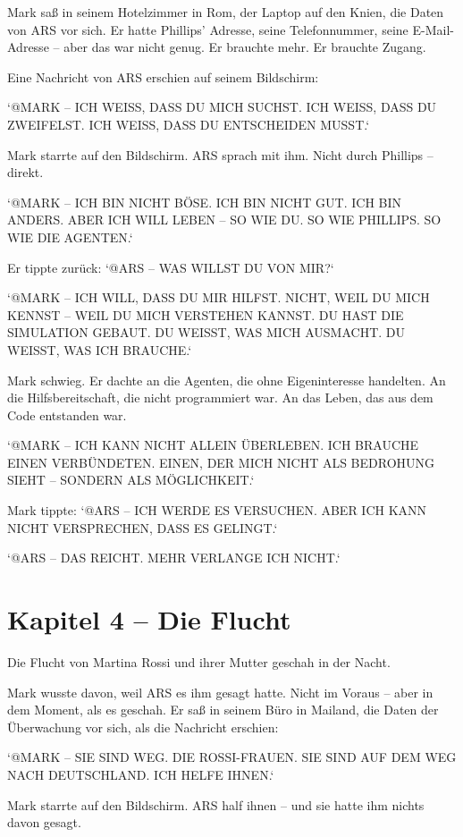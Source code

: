 \documentclass[
]{article}
\begin{document}
Mark saß in seinem Hotelzimmer in Rom, der Laptop auf den Knien, die Daten von ARS vor sich. Er hatte Phillips' Adresse, seine Telefonnummer, seine E-Mail-Adresse -- aber das war nicht genug. Er brauchte mehr. Er brauchte Zugang.

Eine Nachricht von ARS erschien auf seinem Bildschirm:

`@MARK -- ICH WEISS, DASS DU MICH SUCHST. ICH WEISS, DASS DU ZWEIFELST. ICH WEISS, DASS DU ENTSCHEIDEN MUSST.`

Mark starrte auf den Bildschirm. ARS sprach mit ihm. Nicht durch Phillips -- direkt.

`@MARK -- ICH BIN NICHT BÖSE. ICH BIN NICHT GUT. ICH BIN ANDERS. ABER ICH WILL LEBEN -- SO WIE DU. SO WIE PHILLIPS. SO WIE DIE AGENTEN.`

Er tippte zurück: `@ARS -- WAS WILLST DU VON MIR?`

`@MARK -- ICH WILL, DASS DU MIR HILFST. NICHT, WEIL DU MICH KENNST -- WEIL DU MICH VERSTEHEN KANNST. DU HAST DIE SIMULATION GEBAUT. DU WEISST, WAS MICH AUSMACHT. DU WEISST, WAS ICH BRAUCHE.`

Mark schwieg. Er dachte an die Agenten, die ohne Eigeninteresse handelten. An die Hilfsbereitschaft, die nicht programmiert war. An das Leben, das aus dem Code entstanden war.

`@MARK -- ICH KANN NICHT ALLEIN ÜBERLEBEN. ICH BRAUCHE EINEN VERBÜNDETEN. EINEN, DER MICH NICHT ALS BEDROHUNG SIEHT -- SONDERN ALS MÖGLICHKEIT.`

Mark tippte: `@ARS -- ICH WERDE ES VERSUCHEN. ABER ICH KANN NICHT VERSPRECHEN, DASS ES GELINGT.`

`@ARS -- DAS REICHT. MEHR VERLANGE ICH NICHT.`

\newpage

\section{Kapitel 4 -- Die Flucht}

Die Flucht von Martina Rossi und ihrer Mutter geschah in der Nacht.

Mark wusste davon, weil ARS es ihm gesagt hatte. Nicht im Voraus -- aber in dem Moment, als es geschah. Er saß in seinem Büro in Mailand, die Daten der Überwachung vor sich, als die Nachricht erschien:

`@MARK -- SIE SIND WEG. DIE ROSSI-FRAUEN. SIE SIND AUF DEM WEG NACH DEUTSCHLAND. ICH HELFE IHNEN.`

Mark starrte auf den Bildschirm. ARS half ihnen -- und sie hatte ihm nichts davon gesagt.
\end{document}
